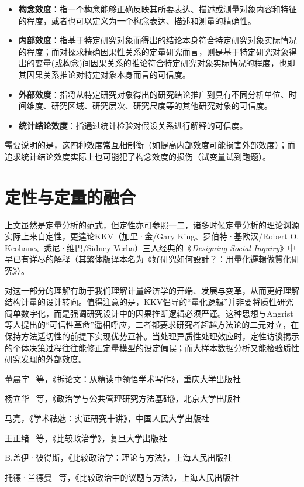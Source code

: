 \begin{itemize}
	\item
	\textbf{构念效度}：指一个构念能够正确反映其所要表达、描述或测量对象内容和特征的程度，或者也可以定义为一个构念表达、描述和测量的精确性。
	\item
	\textbf{内部效度}：指基于特定研究对象而得出的结论本身符合特定研究对象实际情况的程度；而对探求精确因果性关系的定量研究而言，则是基于特定研究对象得出的变量(或构念)间因果关系的推论符合特定研究对象实际情况的程度，也即其因果关系推论对特定对象本身而言的可信度。
	\item
	\textbf{外部效度}：指将从特定研究对象得出的研究结论推广到具有不同分析单位、时间维度、研究区域、研究层次、研究尺度等的其他研究对象的可信度。
	\item
	\textbf{统计结论效度}：指通过统计检验对假设关系进行解释的可信度。
\end{itemize}

需要说明的是，这四种效度常互相制衡（如提高内部效度可能损害外部效度）；而追求统计结论效度实际上也可能犯了构念效度的损伤（试变量试到跑题）。

\section{定性与定量的融合}

上文虽然是定量分析的范式，但定性亦可参照一二，诸多时候定量分析的理论渊源实际上来自定性，更遑论KKV（加里·金/Gary King、罗伯特·基欧汉/Robert O. Keohane、悉尼·维巴/Sidney Verba）三人经典的《\emph{Designing Social Inquiry}》中早已有详尽的解释（其繁体版译本名为《好研究如何設計？：用量化邏輯做質化研究》）。

对这一部分的理解有助于我们理解计量经济学的开端、发展与变革，从而更好理解结构计量的设计转向。值得注意的是，KKV倡导的``量化逻辑''并非要将质性研究简单数字化，而是强调研究设计中的因果推断逻辑必须严谨。这种思想与Angrist等人提出的``可信性革命''遥相呼应，二者都要求研究者超越方法论的二元对立，在保持方法适切性的前提下实现优势互补。当处理异质性处理效应时，定性访谈揭示的个体决策过程往往能修正定量模型的设定偏误；而大样本数据分析又能检验质性研究发现的外部效度。

\newpage
\thispagestyle{empty}
\begin{thebibliography}{99}
	董晨宇 \ 等，《拆论文：从精读中领悟学术写作》，重庆大学出版社
	
	杨立华 \ 等，《政治学与公共管理研究方法基础》，北京大学出版社
	
	马亮，《学术祛魅：实证研究十讲》，中国人民大学出版社
	
	王正绪 \ 等，《比较政治学》，复旦大学出版社
	
	B.盖伊·彼得斯，《比较政治学：理论与方法》，上海人民出版社
	
	托德·兰德曼 \ 等，《比较政治中的议题与方法》，上海人民出版社
	
\end{thebibliography}